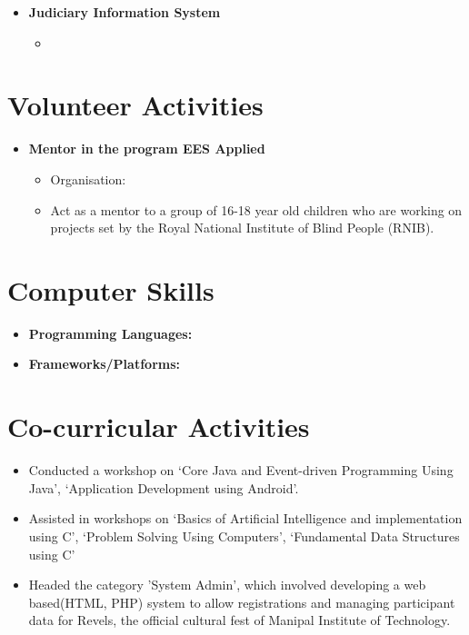 \documentclass[11pt]{article}
\begin{document}
\begin{itemize}
	\item \bf{Judiciary Information System}
	\begin{itemize}
        \item[] 
	\end{itemize}
\end{itemize}

\section*{Volunteer Activities}
\begin{itemize}
	\item\bf{Mentor in the program EES Applied}
	\begin{itemize}
		\item[] Organisation: 
		\item[] Act as a mentor to a group of 16-18 year old children who are working on projects set by the Royal National Institute of Blind People (RNIB).
	\end{itemize}
\end{itemize}

\section*{Computer Skills}
\begin{itemize}
    \item \bf{Programming Languages}: 
	\item \bf{Frameworks/Platforms}: 
\end{itemize}

\section*{Co-curricular Activities}
\begin{itemize}
	\item[] Conducted a workshop on ‘Core Java and Event-driven Programming Using Java’, ‘Application Development using Android’.
	\item[] Assisted in workshops on ‘Basics of Artificial Intelligence and implementation using C’, ‘Problem Solving Using Computers’, ‘Fundamental Data Structures using C’
    \item[] Headed the category ’System Admin’, which involved developing a web based(HTML, PHP) system to allow registrations and managing participant data for Revels, the official cultural fest of Manipal Institute of Technology.
\end{itemize}
\end{document}
